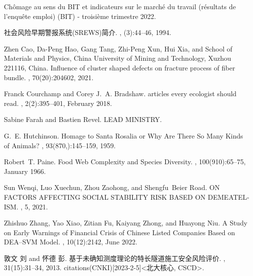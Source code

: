 \begin{thebibliography}{100}
	
	Chômage au sens du {BIT} et indicateurs sur le marché du travail (résultats
	de l’enquête emploi) ({BIT}) - troisième trimestre 2022.
	
	社会风险早期警报系统({SREWS})简介.
	, (3):44--46, 1994.
	
	Zhen Cao, Da-Peng Hao, Gang Tang, Zhi-Peng Xun, Hui Xia, and {School of
		Materials and Physics, China University of Mining and Technology, Xuzhou
		221116, China}.
	\newblock Influence of cluster shaped defects on fracture process of fiber
	bundle.
	, 70(20):204602, 2021.
	
	Franck Courchamp and Corey J.~A. Bradshaw.
	 articles every ecologist should read.
	, 2(2):395--401, February 2018.
	
	
	
	Sabine Farah and Bastien Revel.
	 {LEAD} {MINISTRY}.
	
	G.~E. Hutchinson.
	\newblock Homage to {Santa} {Rosalia} or {Why} {Are} {There} {So} {Many}
	{Kinds} of {Animals}?
	, 93(870,):145--159, 1959.
	

	
	Robert~T. Paine.
	\newblock Food {Web} {Complexity} and {Species} {Diversity}.
	, 100(910):65--75, January 1966.
	
	
	
	Sun Wenqi, Luo Xuechun, Zhou Zaohong, and Shengfu~Beier Road.
	 {ON} {FACTORS} {AFFECTING} {SOCIAL} {STABILITY} {RISK}
	{BASED} {ON} {DEMEATEL}-{ISM}.
	, 5, 2021.
	
		
	Zhishuo Zhang, Yao Xiao, Zitian Fu, Kaiyang Zhong, and Huayong Niu.
	\newblock A {Study} on {Early} {Warnings} of {Financial} {Crisis} of {Chinese}
	{Listed} {Companies} {Based} on {DEA}–{SVM} {Model}.
	, 10(12):2142, June 2022.

	敦文 刘 and 怀德 彭.
	\newblock 基于未确知测度理论的特长隧道施工安全风险评价.
	, 31(15):31--34, 2013.
	 citations(CNKI)[2023-2-5]{\textless}北大核心,
	CSCD{\textgreater}.
	

\end{thebibliography}
